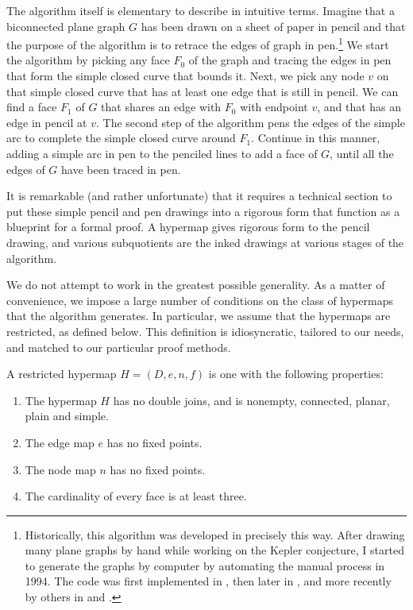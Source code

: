 The algorithm itself is  elementary to describe in intuitive
terms.  Imagine that a biconnected plane graph $G$ has been drawn on a
sheet of paper in pencil and that the purpose of the algorithm is to
retrace the edges of graph in pen.\footnote{Historically, this
  algorithm was developed in precisely this way.  After drawing many
  plane graphs by hand while working on the Kepler conjecture, I
  started to generate the graphs by computer by automating the manual
  process in 1994.  The code was first implemented in ,
  then later in , and more recently by others in  and
  .}  We start the algorithm by picking any face $F_0$ of
the graph and tracing the edges in pen that form the simple closed
curve that bounds it.  Next, we pick any node $v$ on that simple
closed curve that has at least one edge that is still in pencil.  We
can find a face $F_1$ of $G$ that shares an edge with $F_0$ with
endpoint $v$, and that has an edge in pencil at $v$.  The second step
of the algorithm pens the edges of the simple arc to complete the
simple closed curve around $F_1$.  Continue in this manner, adding a
simple arc in pen to the penciled lines to add a face of $G$, until
all the edges of $G$ have been traced in pen.  
% 
%

It is remarkable (and rather unfortunate) that it  requires a
technical section  to put these simple pencil and pen
drawings into a rigorous form that function as a blueprint for a
formal proof.  A hypermap gives rigorous form to the pencil drawing, and various
subquotients are the inked drawings at various stages of the algorithm.


We do not attempt to work in the greatest possible generality.  As a
matter of convenience, we impose a large number of conditions on the
class of hypermaps that the algorithm generates.  In particular, we
assume that the hypermaps are restricted, as defined below.  This
definition is idiosyncratic, tailored to our needs, and matched to our
particular proof methods.


\begin{definition}[restricted]\label{def:restricted}
A restricted hypermap $H = (D,e,n,f)$ is one with the following 
properties:
\begin{enumerate}
\item The hypermap $H$ has no double joins, and is nonempty,
  connected, planar, plain and simple.
\item The edge map $e$ has no fixed points.  %
\item The node map $n$ has no fixed points.
\item The cardinality of every face is at least three.
\end{enumerate}
%
%
\end{definition}

